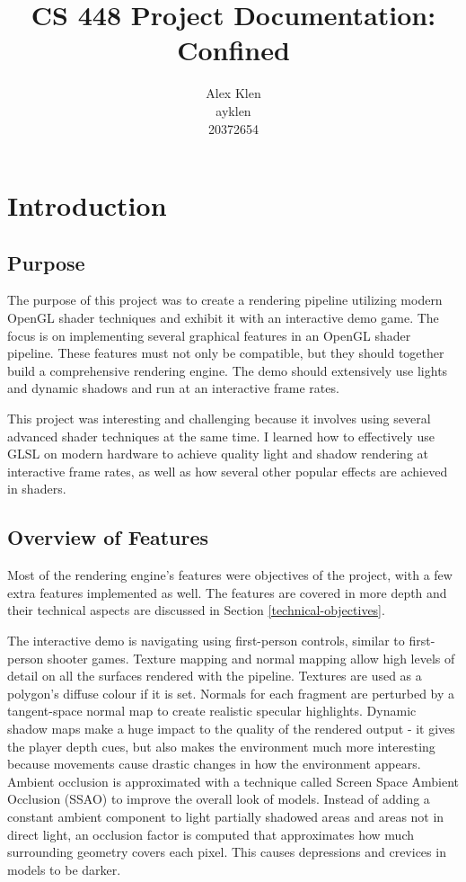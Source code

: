 \documentclass[oneside]{book}
\title{\huge CS 448  Project Documentation: Confined}
\author{Alex Klen \\ ayklen \\ 20372654}
\begin{document}
\maketitle
\tableofcontents

\chapter{Introduction}
  \section{Purpose}
    The purpose of this project was to create a rendering pipeline utilizing modern OpenGL shader techniques and exhibit it with an interactive demo game.
    The focus is on implementing several graphical features in an OpenGL shader pipeline. These features must not only be compatible, but they should together build a comprehensive rendering engine.
    The demo should extensively use lights and dynamic shadows and run at an interactive frame rates.

    This project was interesting and challenging because it involves using several advanced shader techniques at the same time. I learned how to effectively use GLSL on modern hardware to achieve quality light and shadow rendering at interactive frame rates, as well as how several other popular effects are achieved in shaders.

  \section{Overview of Features}
    Most of the rendering engine's features were objectives of the project, with a few extra features implemented as well. The features are covered in more depth and their technical aspects are discussed in Section \ref{technical-objectives}.

    The interactive demo is navigating using first-person controls, similar to first-person shooter games.
    Texture mapping and normal mapping allow high levels of detail on all the surfaces rendered with the pipeline. Textures are used as a polygon's diffuse colour if it is set. Normals for each fragment are perturbed by a tangent-space normal map to create realistic specular highlights.
    Dynamic shadow maps make a huge impact to the quality of the rendered output - it gives the player depth cues, but also makes the environment much more interesting because movements cause drastic changes in how the environment appears.
    Ambient occlusion is approximated with a technique called Screen Space Ambient Occlusion (SSAO) to improve the overall look of models. Instead of adding a constant ambient component to light partially shadowed areas and areas not in direct light, an occlusion factor is computed that approximates how much surrounding geometry covers each pixel. This causes depressions and crevices in models to be darker.
\end{document}
